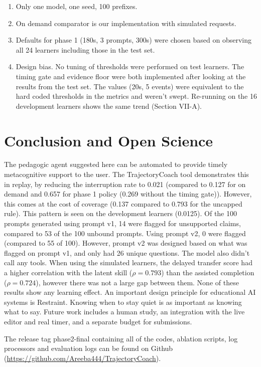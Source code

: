 \documentclass[conference]{IEEEtran}
\begin{document}
\begin{enumerate}
\item[10.] Only one model, one seed, 100 prefixes.

\item[11.] On demand comparator is our implementation with simulated requests.

\item[12.] Defaults for phase 1 (180s, 3 prompts, 300s) were chosen based on observing all 24 learners including those in the test set.

\item[13.] Design bias. No tuning of thresholds were performed on test learners. The timing gate and evidence floor were both implemented after looking at the results from the test set. The values (20s, 5 events) were equivalent to the hard coded thresholds in the metrics and weren't swept. Re-running on the 16 development learners shows the same trend (Section VII-A).
\end{enumerate}

\section{Conclusion and Open Science}

The pedagogic agent suggested here can be automated to provide timely metacognitive support to the user. The TrajectoryCoach tool demonstrates this in replay, by reducing the interruption rate to 0.021 (compared to 0.127 for on demand and 0.657 for phase 1 policy (0.269 without the timing gate)). However, this comes at the cost of coverage (0.137 compared to 0.793 for the uncapped rule). This pattern is seen on the development learners (0.0125). Of the 100 prompts generated using prompt v1, 14 were flagged for unsupported claims, compared to 53 of the 100 unbound prompts. Using prompt v2, 0 were flagged (compared to 55 of 100). However, prompt v2 was designed based on what was flagged on prompt v1, and only had 26 unique questions. The model also didn't call any tools. When using the simulated learners, the delayed transfer score had a higher correlation with the latent skill ($\rho = 0.793$) than the assisted completion ($\rho = 0.724$), however there was not a large gap between them. None of these results show any learning effect. An important design principle for educational AI systems is Restraint. Knowing when to stay quiet is as important as knowing what to say. Future work includes a human study, an integration with the live editor and real timer, and a separate budget for submissions.

The release tag phase2-final containing all of the codes, ablation scripts, log processors and evaluation logs can be found on Github (\url{https://github.com/Areeba444/TrajectoryCoach}).

\nocite{*}


\end{document}
